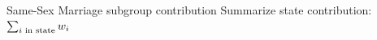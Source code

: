 
\begin{frame}{Same-Sex Marriage subgroup contribution}
Summarize state contribution: $\sum_{i \textrm{ in state}} w_i$
\centering
\begin{minipage}{0.9\textwidth}
    \centering
\LaxphilipsCAPoolingPlot{}
\end{minipage}

\end{frame}














